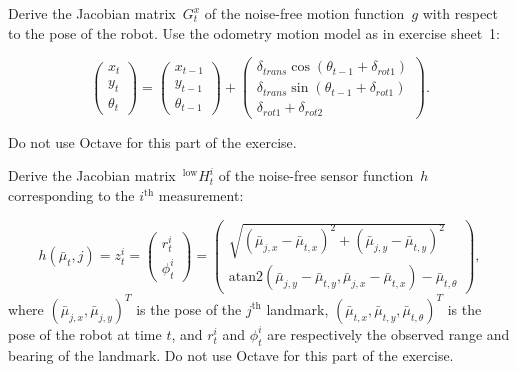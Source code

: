 \documentclass[12pt,a4paper]{article}
\begin{document}
\begin{enumialpha}
    \item Derive the Jacobian matrix~$G^x_t$ of the noise-free motion function~$g$ with respect to the pose of the robot. Use the odometry motion model as in exercise sheet~1:

\begin{equation*}
     \left(\begin{array}{c} x_t \\ y_t \\ \theta_t \end{array}\right) = \left(\begin{array}{c} x_{t-1} \\ y_{t-1} \\ \theta_{t-1} \end{array}\right) + \left(\begin{array}{c} \delta_{trans} \cos(\theta_{t-1} + \delta_{rot1}) \\ \delta_{trans} \sin(\theta_{t-1} + \delta_{rot1}) \\ \delta_{rot1} + \delta_{rot2} \end{array}\right).
\end{equation*}

Do not use Octave for this part of the exercise.

    \item Derive the Jacobian matrix~$^{\textrm{low}}H^i_t$ of the noise-free sensor function~$h$ corresponding to the $i^{\textrm{th}}$ measurement:

\begin{equation*}
 h(\bar{\mu}_t,j) =  z^i_t = \left(\begin{array}{c} r^i_t \\ \phi^i_t  \end{array}\right) = \left(\begin{array}{c} \sqrt{(\bar{\mu}_{j,x} - \bar{\mu}_{t,x})^2 + (\bar{\mu}_{j,y} - \bar{\mu}_{t,y})^2} \\ \textrm{atan2}(\bar{\mu}_{j,y} - \bar{\mu}_{t,y}, \bar{\mu}_{j,x} - \bar{\mu}_{t,x})-\bar{\mu}_{t,\theta} \end{array}\right),
\end{equation*}
where $(\bar{\mu}_{j,x}, \bar{\mu}_{j,y})^T$ is the pose of the $j^{\textrm{th}}$ landmark, $(\bar{\mu}_{t,x}, \bar{\mu}_{t,y}, \bar{\mu}_{t,\theta})^T$ is the pose of the robot at time $t$, and $r^i_t$ and $\phi^i_t$ are respectively the observed range and bearing of the landmark. Do not use Octave for this part of the exercise.\\


\end{enumialpha}
\end{document}
